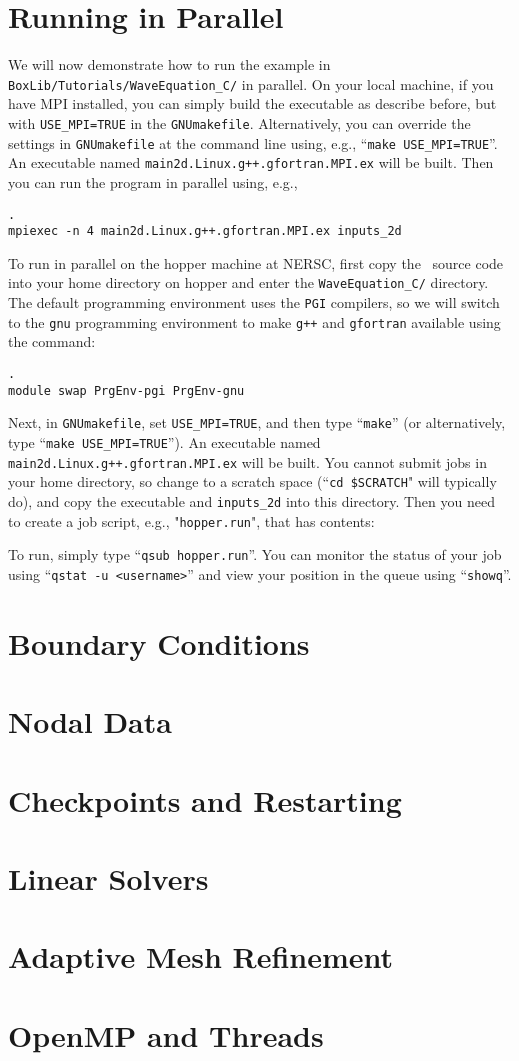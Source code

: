 \section{Running in Parallel}
We will now demonstrate how to run the example in {\tt BoxLib/Tutorials/WaveEquation\_C/}
in parallel.  On your local machine, if you have MPI installed, you can simply build
the executable as describe before, but with {\tt USE\_MPI=TRUE} in the {\tt GNUmakefile}.
Alternatively, you can override the settings in {\tt GNUmakefile} at the command line
using, e.g., ``{\tt make USE\_MPI=TRUE}''.  
An executable named {\tt main2d.Linux.g++.gfortran.MPI.ex} will be built.
Then you can run the program in parallel using, e.g.,
\begin{lstlisting}[backgroundcolor=\color{light-red}].
mpiexec -n 4 main2d.Linux.g++.gfortran.MPI.ex inputs_2d
\end{lstlisting}

To run in parallel on the hopper machine at NERSC, first copy the \BoxLib\ source code
into your home directory on hopper and enter the {\tt WaveEquation\_C/} directory.
The default programming environment uses the {\tt PGI} compilers, so we will switch to the
{\tt gnu} programming environment to make {\tt g++} and {\tt gfortran} available
using the command:
\begin{lstlisting}[backgroundcolor=\color{light-red}].
module swap PrgEnv-pgi PrgEnv-gnu
\end{lstlisting}
Next, in {\tt GNUmakefile}, set {\tt USE\_MPI=TRUE}, and then type ``{\tt make}''
(or alternatively, type ``{\tt make USE\_MPI=TRUE}'').
An executable named {\tt main2d.Linux.g++.gfortran.MPI.ex} will be built.
You cannot submit jobs in your home directory, so change to a scratch space
(``{\tt cd \$SCRATCH}" will typically do), and copy the executable and
{\tt inputs\_2d} into this directory.  Then you need to create a job script,
e.g., "{\tt hopper.run}", that has contents:

To run, simply type ``{\tt qsub hopper.run}''.  You can monitor the status of your job
using ``{\tt qstat -u <username>}'' and view your position in the queue 
using ``{\tt showq}''.

\section{Boundary Conditions}

\section{Nodal Data}

\section{Checkpoints and Restarting}

\section{Linear Solvers}

\section{Adaptive Mesh Refinement}

\section{OpenMP and Threads}
